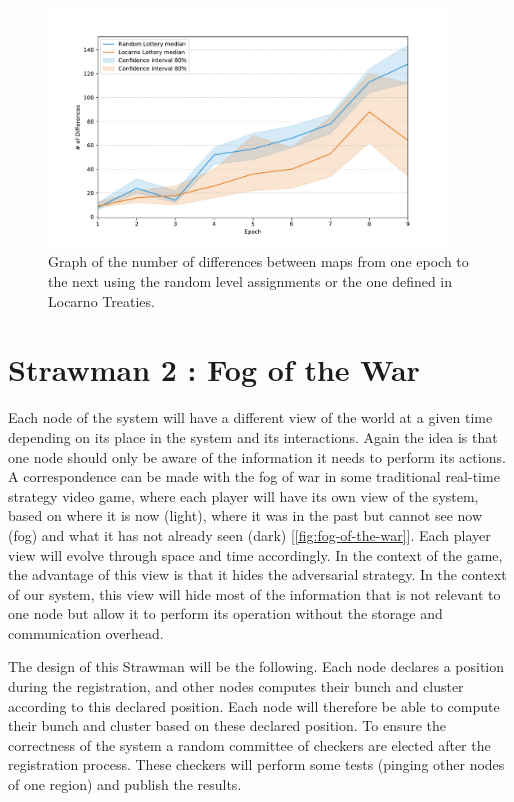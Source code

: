 \documentclass[a4paper,11pt,oneside]{report}
\begin{document}
\begin{figure}[!h] 
\centering
\includegraphics[width=300pt]{figures/LocarnoTreaties-differences}
\caption{Graph of the number of differences between maps from one epoch to the next
using the random level assignments or the one defined in Locarno Treaties. }
\label{fig:LocarnoTreaties-differences} \end{figure}

\section{Strawman 2 : Fog of the War} \label{sec:Fog-of-the-war}

Each node of the system will have a different view of the world at a given time
depending on its place in the system and its interactions. Again the idea is
that one node should only be aware of the information it needs to perform its
actions. A correspondence can be made with the fog of war in some traditional real-time
strategy video game, where each player will have its own view of the system,
based on where it is now (light), where it was in the past but
cannot see now (fog) and what it has not already seen (dark) [\autoref{fig:fog-of-the-war}].
Each player view will evolve through space and time accordingly. In the context
of the game, the advantage of this view is that it hides the adversarial
strategy. In the context of our system, this view will hide most of the
information that is not relevant to one node but allow it to perform its
operation without the storage and communication overhead. 

The design of this Strawman will be the following. Each node declares a
position during the registration, and other nodes computes their bunch and
cluster according to this declared position. Each node will therefore be able
to compute their bunch and cluster based on these declared position. To ensure
the correctness of the system a random committee of checkers are elected after
the registration process. These checkers will perform some tests (pinging other
nodes of one region) and publish the results. 
\end{document}
